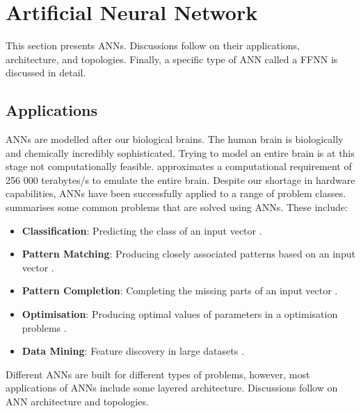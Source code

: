 \section{Artificial Neural Network}
\label{sec:anns:ann}

This section presents \acp{ANN}. Discussions follow on their applications,
architecture, and topologies. Finally, a specific type of \ac{ANN} called a
\acl{FFNN} is discussed in detail.

\subsection{Applications}
\label{sec:anns:anns:applications}

\acp{ANN} are modelled after our biological brains. The human brain is
biologically and chemically incredibly sophisticated. Trying to model an entire
brain is at this stage not computationally feasible. \citeauthor{ref:sandberg:2008}
\cite{ref:sandberg:2008} approximates a computational requirement of 256 000
terabytes/s to emulate the entire brain. Despite our shortage in hardware
capabilities, \acp{ANN} have been successfully applied to a range of problem
classes. \citeauthor{ref:engelbrecht:2007} \cite{ref:engelbrecht:2007} summarises some common problems
that are solved using \acp{ANN}. These include: 

\begin{itemize}
    \item
    \textbf{Classification}: Predicting the class of an input vector
    \cite{ref:khan:2001}.
    
    \item
    \textbf{Pattern Matching}: Producing closely associated patterns based on an
    input vector \cite{ref:cannady:1998, ref:kumar:1994}.
    
    \item
    \textbf{Pattern Completion}: Completing the missing parts of an input vector
    \cite{ref:dayhoff:2001}.

    \item
    \textbf{Optimisation}: Producing optimal values of parameters in a
    optimisation problems \cite{ref:specht:1991}.

    \item
    \textbf{Data Mining}: Feature discovery in large datasets
    \cite{ref:singh:2009}.
\end{itemize}

Different \acp{ANN} are built for different types of problems, however, most
applications of \acp{ANN} include some layered architecture. Discussions follow
on \ac{ANN} architecture and topologies.

